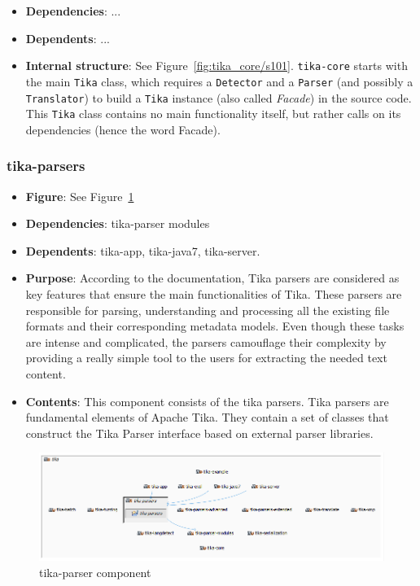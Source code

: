 \documentclass{article}
\begin{document}
\begin{itemize}
    \item \textbf{Dependencies}: ...
    \item \textbf{Dependents}: ...
    \item \textbf{Internal structure}: See Figure~\ref{fig:tika_core/s101}. \texttt{tika-core} starts with the main \texttt{Tika} class, which requires a \texttt{Detector} and a \texttt{Parser} (and possibly a \texttt{Translator}) to build a \texttt{Tika} instance (also called \textit{Facade}) in the source code. This \texttt{Tika} class contains no main functionality itself, but rather calls on its dependencies (hence the word Facade).
\end{itemize}

\subsubsection{tika-parsers}
\begin {itemize}
\item \textbf{Figure}: See Figure~\ref{fig:tika-parser}
\item \textbf{Dependencies}: tika-parser modules
\item \textbf{Dependents}: tika-app, tika-java7, tika-server.
\item \textbf{Purpose}: According to the documentation, Tika parsers are considered as key features that ensure the main functionalities of Tika. These parsers are responsible for parsing, understanding and processing all the existing file formats and their corresponding metadata models. Even though these tasks are intense and complicated, the parsers camouflage their complexity by providing a really simple tool to the users for extracting the needed text content.
\item \textbf{Contents}: This component consists of the tika parsers. Tika parsers are fundamental elements of Apache Tika. They contain a set of classes that construct the Tika Parser interface based on external parser libraries. 
\end{itemize}
\begin{figure}[h!]
    \centering
    \includegraphics[width=1\textwidth]{report/images/tika-parser.PNG}
    \caption{tika-parser component}
    \label{fig:tika-parser}
\end{figure}
\end{document}
